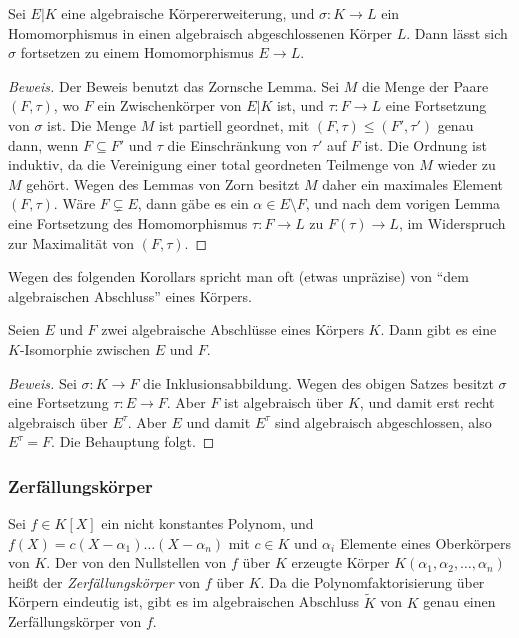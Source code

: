 \documentclass[12pt,a4paper,twoside]{article}
\newcommand{\ei}[1]{\emph{#1}\index{#1}}
\begin{document}
\begin{Satz}\label{S:Forts}
  Sei $E|K$ eine algebraische K\"orpererweiterung, und $\sigma:K\to L$ ein
  Homomorphismus in einen algebraisch abgeschlossenen K\"orper $L$. Dann
  l\"asst sich $\sigma$ fortsetzen zu einem Homomorphismus $E\to L$.
\end{Satz}
\begin{proof}[Beweis]
  Der Beweis benutzt das Zornsche Lemma. Sei $M$ die Menge der Paare
  $(F,\tau)$, wo $F$ ein Zwischenk\"orper von $E|K$ ist, und $\tau:F\to L$
  eine Fortsetzung von $\sigma$ ist. Die Menge $M$ ist partiell geordnet, mit
  $(F,\tau)\le (F',\tau')$ genau dann, wenn $F\subseteq F'$ und $\tau$ die
  Einschr\"ankung von $\tau'$ auf $F$ ist. Die Ordnung ist induktiv, da die
  Vereinigung einer total geordneten Teilmenge von $M$ wieder zu $M$ geh\"ort.
  Wegen des Lemmas von Zorn besitzt $M$ daher ein maximales Element
  $(F,\tau)$. W\"are $F\subsetneq E$, dann g\"abe es ein $\alpha\in E\setminus
  F$, und nach dem vorigen Lemma eine Fortsetzung des Homomorphismus
  $\tau:F\to L$ zu $F(\tau)\to L$, im Widerspruch zur Maximalit\"at von
  $(F,\tau)$.
\end{proof}
Wegen des folgenden Korollars spricht man oft (etwas unpr\"azise) von ``dem
algebraischen Abschluss'' eines K\"orpers.
\begin{Korollar}
Seien $E$ und $F$ zwei algebraische Abschl\"usse eines K\"orpers $K$. Dann
gibt es eine $K$-Isomorphie zwischen $E$ und $F$.  
\end{Korollar}
\begin{proof}[Beweis]
  Sei $\sigma:K\to F$ die Inklusionsabbildung. Wegen des obigen Satzes besitzt
  $\sigma$ eine Fortsetzung $\tau:E\to F$. Aber $F$ ist algebraisch \"uber
  $K$, und damit erst recht algebraisch \"uber $E^\tau$. Aber $E$ und damit
  $E^\tau$ sind algebraisch abgeschlossen, also $E^\tau=F$. Die Behauptung
  folgt.
\end{proof}
\subsubsection{Zerf\"allungsk\"orper}
Sei $f\in K[X]$ ein nicht konstantes Polynom, und
$f(X)=c(X-\alpha_1)\dots(X-\alpha_n)$ mit $c\in K$ und $\alpha_i$ Elemente
eines Oberk\"orpers von $K$. Der von den Nullstellen von $f$ \"uber $K$
erzeugte K\"orper $K(\alpha_1,\alpha_2,\dots,\alpha_n)$ hei\ss t der
\ei{Zerf\"allungsk\"orper} von $f$ \"uber $K$. Da die Polynomfaktorisierung
\"uber K\"orpern eindeutig ist, gibt es im algebraischen Abschluss $\tilde K$
von $K$ genau einen Zerf\"allungsk\"orper von $f$.
\end{document}
